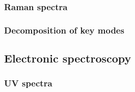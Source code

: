\subsubsection{Raman spectra}
\blindtext[4]
\subsubsection{Decomposition of key modes}
\blindtext[4]

\subsection{Electronic spectroscopy}
\blindtext
\subsubsection{UV spectra}
\blindtext[4]
